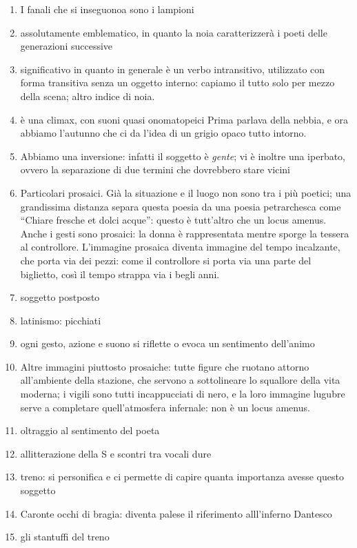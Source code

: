 \documentclass{book}
\begin{document}
\begin{enumerate}

\item I fanali che si inseguonoa sono i lampioni
\item assolutamente emblematico, in quanto
  la noia caratterizzerà i poeti delle generazioni successive
\item significativo in quanto in
  generale è un verbo intransitivo, utilizzato con forma transitiva
  senza un oggetto interno: capiamo il tutto solo per mezzo della scena;
  altro indice di noia.
\item è una climax, con suoni quasi onomatopeici Prima parlava
  della nebbia, e ora abbiamo l'autunno che ci da l'idea di un grigio
  opaco tutto intorno.
\item Abbiamo una inversione: infatti il soggetto è
  \emph{gente}; vi è inoltre una iperbato, ovvero la separazione di due
  termini che dovrebbero stare vicini
\item Particolari prosaici. Già la situazione e il luogo non sono tra i più poetici; una grandissima distanza separa questa poesia da una poesia petrarchesca come “Chiare fresche et dolci acque”: questo è tutt’altro che un locus amenus. Anche i gesti sono prosaici: la donna è rappresentata mentre sporge la tessera al controllore.
L’immagine prosaica diventa immagine del tempo incalzante, che porta via dei pezzi: come il controllore si porta via una parte del biglietto, così il tempo strappa via i begli anni.
\item soggetto postposto
\item latinismo: picchiati
\item ogni gesto, azione e suono si riflette o evoca un sentimento dell'animo
\item Altre immagini piuttosto prosaiche: tutte figure che ruotano attorno all’ambiente della stazione, che servono a sottolineare lo squallore della vita moderna; i vigili sono tutti incappucciati di nero, e la loro immagine lugubre serve a completare quell’atmosfera infernale: non è un locus amenus.
\item oltraggio al sentimento del poeta
\item allitterazione della S e scontri tra vocali dure
\item treno: si personifica e ci permette di capire quanta importanza avesse questo soggetto
\item Caronte occhi di bragia: diventa palese il riferimento alll'inferno Dantesco
\item gli stantuffi del treno

\end{enumerate}
\end{document}
